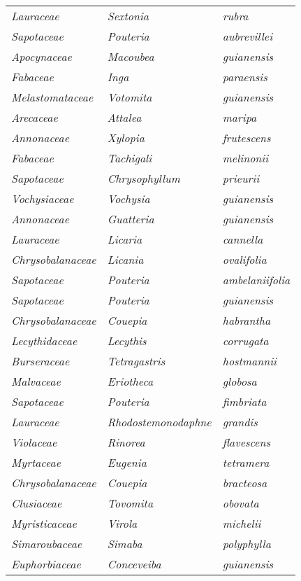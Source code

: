 \documentclass[fleqn,10pt]{ArtEcoFoG} %
\renewenvironment{table}{\begin{table*}}{\end{table*}\ignorespacesafterend}
\begin{document}
\begin{table}
\begin{tabular}[t]{lll}
\addlinespace
\em{Lauraceae} & \em{Sextonia} & \em{rubra}\\
\em{Sapotaceae} & \em{Pouteria} & \em{aubrevillei}\\
\em{Apocynaceae} & \em{Macoubea} & \em{guianensis}\\
\em{Fabaceae} & \em{Inga} & \em{paraensis}\\
\em{Melastomataceae} & \em{Votomita} & \em{guianensis}\\
\addlinespace
\em{Arecaceae} & \em{Attalea} & \em{maripa}\\
\em{Annonaceae} & \em{Xylopia} & \em{frutescens}\\
\em{Fabaceae} & \em{Tachigali} & \em{melinonii}\\
\em{Sapotaceae} & \em{Chrysophyllum} & \em{prieurii}\\
\em{Vochysiaceae} & \em{Vochysia} & \em{guianensis}\\
\addlinespace
\em{Annonaceae} & \em{Guatteria} & \em{guianensis}\\
\em{Lauraceae} & \em{Licaria} & \em{cannella}\\
\em{Chrysobalanaceae} & \em{Licania} & \em{ovalifolia}\\
\em{Sapotaceae} & \em{Pouteria} & \em{ambelaniifolia}\\
\em{Sapotaceae} & \em{Pouteria} & \em{guianensis}\\
\addlinespace
\em{Chrysobalanaceae} & \em{Couepia} & \em{habrantha}\\
\em{Lecythidaceae} & \em{Lecythis} & \em{corrugata}\\
\em{Burseraceae} & \em{Tetragastris} & \em{hostmannii}\\
\em{Malvaceae} & \em{Eriotheca} & \em{globosa}\\
\em{Sapotaceae} & \em{Pouteria} & \em{fimbriata}\\
\addlinespace
\em{Lauraceae} & \em{Rhodostemonodaphne} & \em{grandis}\\
\em{Violaceae} & \em{Rinorea} & \em{flavescens}\\
\em{Myrtaceae} & \em{Eugenia} & \em{tetramera}\\
\em{Chrysobalanaceae} & \em{Couepia} & \em{bracteosa}\\
\em{Clusiaceae} & \em{Tovomita} & \em{obovata}\\
\addlinespace
\em{Myristicaceae} & \em{Virola} & \em{michelii}\\
\em{Simaroubaceae} & \em{Simaba} & \em{polyphylla}\\
\em{Euphorbiaceae} & \em{Conceveiba} & \em{guianensis}\\

\end{tabular}
\end{table}
\end{document}
